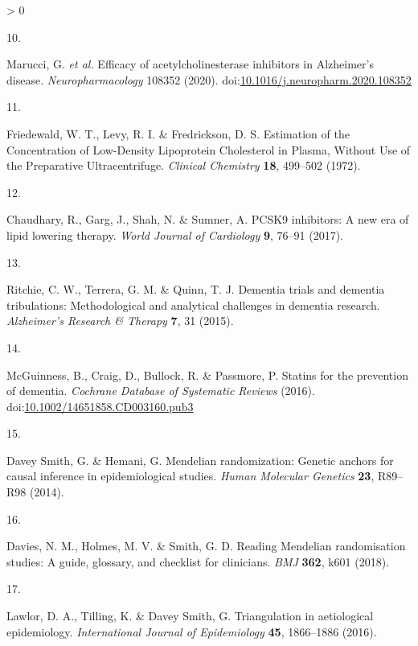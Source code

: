 \documentclass[a4paper, twoside]{templates/ociamthesis}
\newlength{\cslhangindent}
\newlength{\csllabelwidth}
\newenvironment{CSLReferences}[3] %
 {%
  \setlength{\parindent}{0pt}
  \ifodd #1 \everypar{\setlength{\hangindent}{\cslhangindent}}\ignorespaces\fi
  \ifnum #2 > 0
  \setlength{\parskip}{#2\baselineskip}
  \fi
 }%
 {}
\newcommand{\CSLLeftMargin}[1]{\parbox[t]{\maxof{\widthof{#1}}{\csllabelwidth}}{#1}}
\newcommand{\CSLRightInline}[1]{\parbox[t]{\linewidth - \csllabelwidth}{#1}}
\begin{document}
\begin{CSLReferences}{0}{0}
\leavevmode\hypertarget{ref-marucci2020}{}%
\CSLLeftMargin{10. }
\CSLRightInline{Marucci, G. \emph{et al.} Efficacy of acetylcholinesterase inhibitors in {Alzheimer}'s disease. \emph{Neuropharmacology} 108352 (2020). doi:\href{https://doi.org/10.1016/j.neuropharm.2020.108352}{10.1016/j.neuropharm.2020.108352}}

\leavevmode\hypertarget{ref-friedewald1972}{}%
\CSLLeftMargin{11. }
\CSLRightInline{Friedewald, W. T., Levy, R. I. \& Fredrickson, D. S. Estimation of the {Concentration} of {Low}-{Density Lipoprotein Cholesterol} in {Plasma}, {Without Use} of the {Preparative Ultracentrifuge}. \emph{Clinical Chemistry} \textbf{18}, 499--502 (1972).}

\leavevmode\hypertarget{ref-chaudhary2017}{}%
\CSLLeftMargin{12. }
\CSLRightInline{Chaudhary, R., Garg, J., Shah, N. \& Sumner, A. {PCSK9} inhibitors: {A} new era of lipid lowering therapy. \emph{World Journal of Cardiology} \textbf{9}, 76--91 (2017).}

\leavevmode\hypertarget{ref-ritchie2015}{}%
\CSLLeftMargin{13. }
\CSLRightInline{Ritchie, C. W., Terrera, G. M. \& Quinn, T. J. Dementia trials and dementia tribulations: Methodological and analytical challenges in dementia research. \emph{Alzheimer's Research \& Therapy} \textbf{7}, 31 (2015).}

\leavevmode\hypertarget{ref-mcguinness2016a}{}%
\CSLLeftMargin{14. }
\CSLRightInline{McGuinness, B., Craig, D., Bullock, R. \& Passmore, P. Statins for the prevention of dementia. \emph{Cochrane Database of Systematic Reviews} (2016). doi:\href{https://doi.org/10.1002/14651858.CD003160.pub3}{10.1002/14651858.CD003160.pub3}}

\leavevmode\hypertarget{ref-daveysmith2014}{}%
\CSLLeftMargin{15. }
\CSLRightInline{Davey Smith, G. \& Hemani, G. Mendelian randomization: Genetic anchors for causal inference in epidemiological studies. \emph{Human Molecular Genetics} \textbf{23}, R89--R98 (2014).}

\leavevmode\hypertarget{ref-davies2018}{}%
\CSLLeftMargin{16. }
\CSLRightInline{Davies, N. M., Holmes, M. V. \& Smith, G. D. Reading {Mendelian} randomisation studies: A guide, glossary, and checklist for clinicians. \emph{BMJ} \textbf{362}, k601 (2018).}

\leavevmode\hypertarget{ref-lawlor2016a}{}%
\CSLLeftMargin{17. }
\CSLRightInline{Lawlor, D. A., Tilling, K. \& Davey Smith, G. Triangulation in aetiological epidemiology. \emph{International Journal of Epidemiology} \textbf{45}, 1866--1886 (2016).}


\end{CSLReferences}
\end{document}
